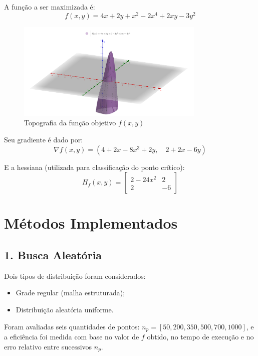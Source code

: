 \documentclass[12pt]{article}
\begin{document}
A função a ser maximizada é:
\begin{equation}
    f(x, y) = 4x + 2y + x^2 - 2x^4 + 2xy - 3y^2
\end{equation}

\begin{figure}[H]
    \centering
    \includegraphics[width=0.8\textwidth]{img/topologia-f_obj.png}
    \caption{Topografia da função objetivo $f(x, y)$}
\end{figure}

Seu gradiente é dado por:
\begin{equation}
    \nabla f(x, y) = \left(4 + 2x - 8x^3 + 2y, \quad 2 + 2x - 6y\right)
\end{equation}

E a hessiana (utilizada para classificação do ponto crítico):
\begin{equation}
    H_f(x, y) = \begin{bmatrix} 2 - 24x^2 & 2 \\ 2 & -6 \end{bmatrix}
\end{equation}

\section*{Métodos Implementados}

\subsection*{1. Busca Aleatória}

Dois tipos de distribuição foram considerados:
\begin{itemize}
    \item Grade regular (malha estruturada);
    \item Distribuição aleatória uniforme.
\end{itemize}

Foram avaliadas seis quantidades de pontos: $n_p = [50, 200, 350, 500, 700, 1000]$, e a eficiência foi medida com base no valor de $f$ obtido, no tempo de execução e no erro relativo entre sucessivos $n_p$.
\end{document}
